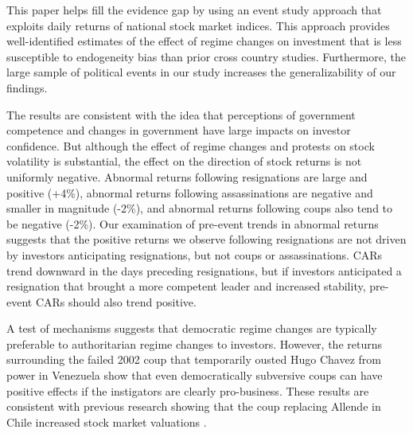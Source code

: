 \documentclass[12pt,final,fleqn]{article}
\theoremstyle{plain}
\begin{document}
This paper helps fill the evidence gap by using an event study approach that exploits daily returns of national stock market indices. This approach provides well-identified estimates of the effect of regime changes on investment that is less susceptible to endogeneity bias than prior cross country studies. Furthermore, the large sample of political events in our study increases the generalizability of our findings.  

The results are consistent with the idea that perceptions of government competence and changes in government have large impacts on investor confidence. But although the effect of regime changes and protests on stock volatility is substantial, the effect on the direction of stock returns is not uniformly negative. Abnormal returns following resignations are large and positive (+4\%), abnormal returns following assassinations are negative and smaller in magnitude (-2\%), and abnormal returns following coups also tend to be negative (-2\%). Our examination of pre-event trends in abnormal returns suggests that the positive returns we observe following resignations are not driven by investors anticipating resignations, but not coups or assassinations. CARs trend downward in the days preceding resignations, but if investors anticipated a resignation that brought a more competent leader and increased stability, pre-event CARs should also trend positive. 

A test of mechanisms suggests that democratic regime changes are typically preferable to authoritarian regime changes to investors. However, the returns surrounding the failed 2002 coup that temporarily ousted Hugo Chavez from power in Venezuela show that even democratically subversive coups can have positive effects if the instigators are clearly pro-business. These results are consistent with previous research showing that the coup replacing Allende in Chile increased stock market valuations \citep{girardi2018institution}. 
\end{document}

